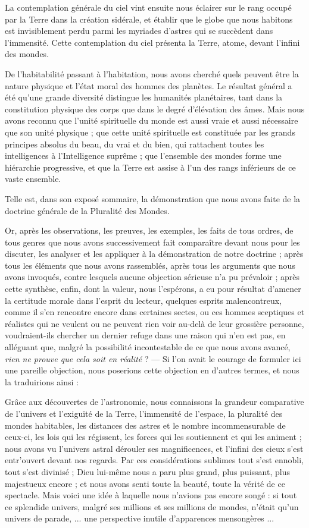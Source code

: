 \documentclass[a4paper, 11pt, oneside]{article}
\begin{document}
La contemplation générale du ciel vint ensuite nous éclairer sur le rang occupé par la Terre dans la création sidérale, et établir que le globe que nous habitons est invisiblement perdu parmi les myriades d'astres qui se succèdent dans l'immensité. Cette contemplation du ciel présenta la Terre, atome, devant l'infini des mondes.

De l'habitabilité passant à l'habitation, nous avons cherché quels peuvent être la nature physique et l'état moral des hommes des planètes. Le résultat général a été qu'une grande diversité distingue les humanités planétaires, tant dans la constitution physique des corps que dans le degré d'élévation des âmes. Mais nous avons reconnu que l'unité spirituelle du monde est aussi vraie et aussi nécessaire que son unité physique ; que cette unité spirituelle est constituée par les grands principes absolus du beau, du vrai et du bien, qui rattachent toutes les intelligences à l'Intelligence suprême ; que l'ensemble des mondes forme une hiérarchie progressive, et que la Terre est assise à l'un des rangs inférieurs de ce vaste ensemble.

Telle est, dans son exposé sommaire, la démonstration que nous avons faite de la doctrine générale de la Pluralité des Mondes.

Or, après les observations, les preuves, les exemples, les faits de tous ordres, de tous genres que nous avons successivement fait comparaître devant nous pour les discuter, les analyser et les appliquer à la démonstration de notre doctrine ; après tous les éléments que nous avons rassemblés, après tous les arguments que nous avons invoqués, contre lesquels aucune objection sérieuse n'a pu prévaloir ; après cette synthèse, enfin, dont la valeur, nous l'espérons, a eu pour résultat d'amener la certitude morale dans l'esprit du lecteur, quelques esprits malencontreux, comme il s'en rencontre encore dans certaines sectes, ou ces hommes sceptiques et réalistes qui ne veulent ou ne peuvent rien voir au-delà de leur grossière personne, voudraient-ils chercher un dernier refuge dans une raison qui n'en est pas, en alléguant que, malgré la possibilité incontestable de ce que nous avons avancé, \emph{rien ne prouve que cela soit en réalité} ? --- Si l'on avait le courage de formuler ici une pareille objection, nous poserions cette objection en d'autres termes, et nous la traduirions ainsi :

Grâce aux découvertes de l'astronomie, nous connaissons la grandeur comparative de l'univers et l'exiguïté de la Terre, l'immensité de l'espace, la pluralité des mondes habitables, les distances des astres et le nombre incommensurable de ceux-ci, les lois qui les régissent, les forces qui les soutiennent et qui les animent ; nous avons vu l'univers astral dérouler ses magnificences, et l'infini des cieux s'est entr'ouvert devant nos regards. Par ces considérations sublimes tout s'est ennobli, tout s'est divinisé ; Dieu lui-même nous a paru plus grand, plus puissant, plus majestueux encore ; et nous avons senti toute la beauté, toute la vérité de ce spectacle. Mais voici une idée à laquelle nous n'avions pas encore songé : si tout ce splendide univers, malgré ses millions et ses millions de mondes, n'était qu'un univers de parade, ... une perspective inutile d'apparences mensongères ...
\end{document}
